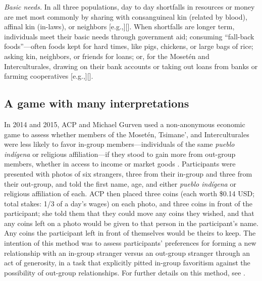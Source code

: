 \documentclass[bibauthoryear]{aa}
\begin{document}
\emph{Basic needs.} In all three populations, day to day shortfalls in resources or money are met most commonly by sharing with consanguineal kin (related by blood), affinal kin (in-laws), or neighbors [e.g.,][]\citep{jaeggi2016reciprocal}. When shortfalls are longer term, individuals meet their basic needs through government aid; consuming ``fall-back foods''---often foods kept for hard times, like pigs, chickens, or large bags of rice; asking kin, neighbors, or friends for loans; or, for the Moset\'en and Interculturales, drawing on their bank accounts or taking out loans from banks or farming cooperatives [e.g.,][]\citep{pisorjones2020}. %

\subsection{A game with many interpretations}\label{boliviagame}

In 2014 and 2015, ACP and Michael Gurven used a non-anonymous economic game to assess whether members of the Moset\'en, Tsimane', and Interculturales were less likely to favor in-group members---individuals of the same \textit{pueblo ind\'igena} or religious affiliation---if they stood to gain more from out-group members, whether in access to income or  market goods \citep{pisor2016risk, pisor2018diversify}. Participants were presented with photos of six strangers, three from their in-group and three from their out-group, and told the first name, age, and either \textit{pueblo ind\'igena} or religious affiliation of each. ACP then placed three coins (each worth \$0.14 USD; total stakes: 1/3 of a day's wages) on each photo, and three coins in front of the participant; she told them that they could move any coins they wished, and that any coins left on a photo would be given to that person in the participant's name. Any coins the participant left in front of themselves would be theirs to keep. The intention of this method was to assess participants' preferences for forming a new relationship with an in-group stranger versus an out-group stranger through an act of generosity, in a task that explicitly pitted in-group favoritism against the possibility of out-group relationships. For further details on this method, see \citet{pisor2016risk, pisor2018diversify}.
\end{document}
